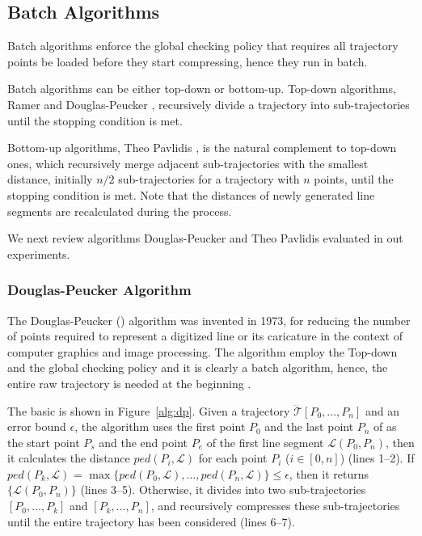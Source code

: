 \subsection{Batch Algorithms}

Batch algorithms enforce the global checking policy that requires all trajectory points be loaded before they start compressing, hence they run in batch.

Batch algorithms can be either top-down or bottom-up.
Top-down algorithms, \eg Ramer \cite{Ramer:Split} and Douglas-Peucker \cite{Douglas:Peucker}, recursively divide a trajectory into sub-trajectories until the stopping condition is met.

Bottom-up algorithms, \eg Theo Pavlidis \cite{Pavlidis:Segment}, is the natural complement to top-down ones, which recursively merge adjacent sub-trajectories with the smallest distance, initially $n/2$  sub-trajectories for a trajectory with $n$ points, until the stopping condition is met. Note that the distances of newly generated line segments are recalculated during the process.

We next review algorithms Douglas-Peucker and Theo Pavlidis evaluated in out experiments.
\subsubsection{Douglas-Peucker Algorithm}

The Douglas-Peucker (\dpa) algorithm \cite{Douglas:Peucker} was invented in 1973, for reducing the number of points required to represent a digitized line or its caricature in the context of computer graphics and image processing.
The \dpa algorithm employ the Top-down and the global checking policy and it is clearly a batch algorithm, hence, the entire raw trajectory is needed at the beginning \cite{Meratnia:Spatiotemporal}.

The basic \dpa is shown in Figure~\ref{alg:dp}.
Given a trajectory $\dddot{\mathcal{T}}[P_0, \ldots, P_n]$ and an error bound $\epsilon$, the algorithm uses the first point $P_0$ and the last point $P_n$ of  as the start point $P_s$ and the end point $P_e$ of the first line segment $\mathcal{L}(P_0, P_n)$, then it calculates the distance $ped(P_i, {\mathcal{L}})$ for each point $P_i$ ($i\in[0,n]$) (lines 1--2). If $ped(P_k, {\mathcal{L}})$ = $\max \{ped(P_0, {\mathcal{L}}), \ldots, ped(P_n, {\mathcal{L}}) \} \le \epsilon$, then it returns $\{\mathcal{L}(P_0,P_n)\}$ (lines 3--5). Otherwise, it divides  into two sub-trajectories $[P_0, \ldots, P_k]$ and $[P_{k}, \ldots, P_n]$, and recursively compresses these sub-trajectories until the entire trajectory has been considered (lines 6--7).


